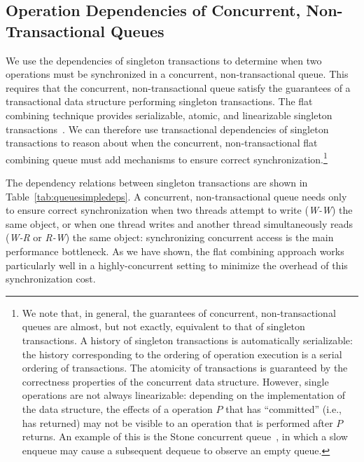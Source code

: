 \subsection{Operation Dependencies of Concurrent, Non-Transactional Queues}

We use the dependencies of singleton transactions to determine when two operations must be synchronized in a concurrent, non-transactional queue. This requires that the concurrent, non-transactional queue satisfy the guarantees of a transactional data structure performing singleton transactions.
The flat combining technique provides serializable, atomic, and linearizable singleton transactions~\cite{flatcombining}. We can therefore use transactional dependencies of singleton transactions to reason about when the concurrent, non-transactional flat combining queue must add mechanisms to ensure correct synchronization.\footnote{We note that, in general, the guarantees of concurrent, non-transactional queues are almost, but not exactly, equivalent to that of singleton transactions. A history of singleton transactions is automatically serializable: the history corresponding to the ordering of operation execution is a serial ordering of transactions. The atomicity of transactions is guaranteed by the correctness properties of the concurrent data structure. However, single operations are not always linearizable: depending on the implementation of the data structure, the effects of a operation $P$ that has ``committed'' (i.e., has returned) may not be visible to an operation that is performed after $P$ returns. An example of this is the Stone concurrent queue~\cite{stone}, in which a slow enqueue may cause a subsequent dequeue to observe an empty queue.}

The dependency relations between singleton transactions are shown in Table~\ref{tab:queuesimpledeps}. 
A concurrent, non-transactional queue needs only to ensure correct synchronization when two threads attempt to write (\emph{W-W}) the same object, or when one thread writes and another thread simultaneously reads (\emph{W-R} or \emph{R-W}) the same object: synchronizing concurrent access is the main performance bottleneck. As we have shown, the flat combining approach works particularly well in a highly-concurrent setting to minimize the overhead of this synchronization cost.

